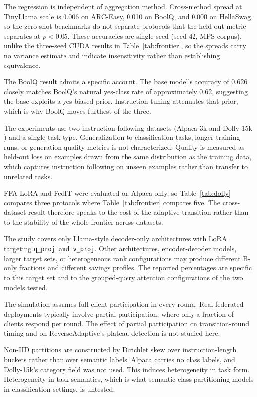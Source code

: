\documentclass[pdflatex,sn-nature,lineno]{sn-jnl}
\begin{document}
The regression is independent of aggregation method. Cross-method spread at TinyLlama scale is 0.006 on ARC-Easy, 0.010 on BoolQ, and 0.000 on HellaSwag, so the zero-shot benchmarks do not separate protocols that the held-out metric separates at $p < 0.05$. These accuracies are single-seed (seed 42, MPS corpus), unlike the three-seed CUDA results in Table~\ref{tab:frontier}, so the spreads carry no variance estimate and indicate insensitivity rather than establishing equivalence.

The BoolQ result admits a specific account. The base model's accuracy of 0.626 closely matches BoolQ's natural yes-class rate of approximately 0.62, suggesting the base exploits a yes-biased prior. Instruction tuning attenuates that prior, which is why BoolQ moves furthest of the three.

\label{sec:limitations}
The experiments use two instruction-following datasets (Alpaca-3k \cite{taori2023alpaca} and Dolly-15k \cite{dolly2023}) and a single task type. Generalization to classification tasks, longer training runs, or generation-quality metrics is not characterized. Quality is measured as held-out loss on examples drawn from the same distribution as the training data, which captures instruction following on unseen examples rather than transfer to unrelated tasks.

FFA-LoRA and FedIT were evaluated on Alpaca only, so Table~\ref{tab:dolly} compares three protocols where Table~\ref{tab:frontier} compares five. The cross-dataset result therefore speaks to the cost of the adaptive transition rather than to the stability of the whole frontier across datasets.

The study covers only Llama-style decoder-only architectures with LoRA targeting \mbox{\texttt{q\_proj} and \texttt{v\_proj}}. Other architectures, encoder-decoder models, larger target sets, or heterogeneous rank configurations may produce different B-only fractions and different savings profiles. The reported percentages are specific to this target set and to the grouped-query attention configurations of the two models tested.

The simulation assumes full client participation in every round. Real federated deployments typically involve partial participation, where only a fraction of clients respond per round. The effect of partial participation on transition-round timing and on ReverseAdaptive's plateau detection is not studied here.

Non-IID partitions are constructed by Dirichlet skew over instruction-length buckets rather than over semantic labels; Alpaca carries no class labels, and Dolly-15k's category field was not used. This induces heterogeneity in task form. Heterogeneity in task semantics, which is what semantic-class partitioning models in classification settings, is untested.
\end{document}
